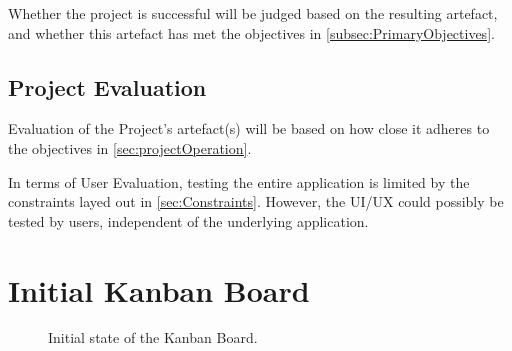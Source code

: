 \documentclass[11pt, a4paper, notitlepage]{report}
\begin{document}
Whether the project is successful will be judged based on the resulting 
artefact, and whether this artefact has met the objectives in 
\ref{subsec:PrimaryObjectives}.

\section{Project Evaluation}
Evaluation of the Project's artefact(s) will be based on how close it adheres 
to the objectives in \ref{sec:projectOperation}.

In terms of User Evaluation, testing the entire application is limited by the 
constraints layed out in \ref{sec:Constraints}. However, the UI/UX could 
possibly be tested by users, independent of the underlying application.

\appendix
\chapter{Initial Kanban Board}\label{app:KanBan}
\begin{figure}[h]
    \centering
    \caption{Initial state of the Kanban Board.}
    \label{fig:kanbanboardmerged}
\end{figure}
\end{document}
